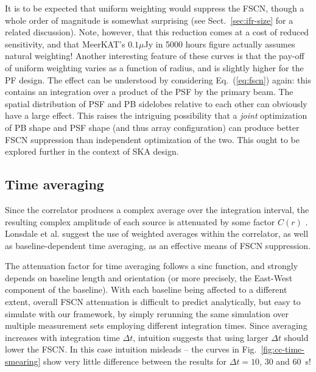\documentclass{aa}
\begin{document}
It is to be expected that uniform weighting would suppress the FSCN, though a whole order of magnitude is somewhat surprising (see Sect.~\ref{sec:ifr-size} for a related discussion). Note, however, that this reduction comes at a cost of reduced sensitivity, and that MeerKAT's $0.1\mu$Jy in 5000 hours figure actually assumes natural weighting! Another interesting feature of these curves is that the pay-off of uniform weighting varies as a function of radius, and is slightly higher for the PF design. The effect can be understood by considering  Eq.~(\ref{eq:fscn}) again: this contains an integration over a product of the PSF by the primary beam. The spatial distribution of PSF and PB sidelobes relative to each other can obviously have a large effect. This raises the intriguing possibility that a \emph{joint} optimization of PB shape and PSF shape (and thus array configuration) can produce better FSCN suppression than independent optimization of the two. This ought to be explored further in the context of SKA 
design.

\subsection{Time averaging}
\label{sec:smearing}

Since the correlator produces a complex average over the integration interval, the resulting complex amplitude of each source is attenuated by some factor $C(r)$ \citep[see Eq.~(\ref{eq:fscn}) above, and also Fig.~2 of][]{SKA54-expa,SKA54}. Lonsdale et al. suggest the use of weighted averages within the correlator, as well as baseline-dependent time averaging, as an effective means of FSCN suppression.

The attenuation factor for time averaging follows a sinc function, and strongly depends on baseline length and orientation (or more precisely, the East-West component of the baseline). With each baseline being affected to a different extent, overall FSCN attenuation is difficult to predict analytically, but easy to simulate with our framework, by simply rerunning the same simulation over multiple measurement sets employing different integration times. Since averaging increases with integration time $\Delta t$, intuition suggests that using larger $\Delta t$ should lower the FSCN. In this case intuition misleads -- the curves in Fig.~\ref{fig:cc-time-smearing} show very little difference between the results for $\Delta t=10$, 30 and 60~s!
\end{document}
